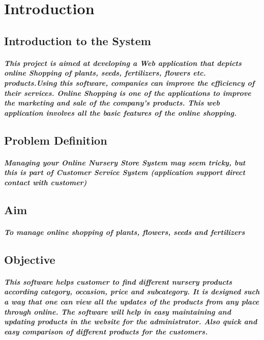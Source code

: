 \documentclass[12pt]{report}
\begin{document}
    \tableofcontents
    \chapter{Introduction}
    \section{Introduction to the System}
    \paragraph{
    This project is aimed at developing a Web application that depicts online Shopping of plants, seeds, fertilizers, flowers etc. products.Using this software, companies can improve the efficiency of their services. Online Shopping is one of the applications to improve the marketing and sale of the company’s products. This web application involves all the basic features of the online shopping.
    }
    \section{Problem Definition}
    \paragraph
    {
    Managing your Online Nursery Store System may seem tricky, but this is part of Customer Service System (application support direct contact with customer)
    }
    \section{Aim}
    \paragraph
    {
    To manage online shopping of plants, flowers, seeds and fertilizers
    }
    \section{Objective}
    \paragraph
    {
    This software helps customer to find different nursery products according category, occasion, price and subcategory. It is designed such a way that one can view all the updates of the products from any place through online. The software will help in easy maintaining and updating products in the website for the administrator. Also quick and easy comparison of different products for the customers.
    }
\end{document}
